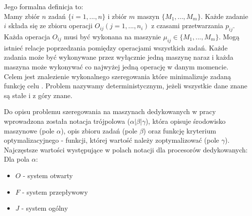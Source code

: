 \documentclass[brudnopis]{xmgr}
\begin{document}
Jego formalna definicja to:\\
Mamy zbiór $n$ zadań $\{i = 1,...,n\}$ i zbiór $m$ maszyn $\{M_1,...,M_m\}$. Każde zadanie $i$ składa się ze zbioru operacji $O_{ij} (j=1,...,n_i)$ z czasami przetwarzania $p_{ij}$. Każda operacja $O_{ij}$ musi być wykonana na maszynie $\mu_{ij} \in \{M_1,...,M_m\}$. Mogą istnieć relacje poprzedzania pomiędzy operacjami wszystkich zadań. Każde zadania może być wykonywane przez wyłącznie jedną maszynę naraz i każda maszyna może wykonywać co najwyżej jedną operację w danym momencie. Celem jest znalezienie wykonalnego szeregowania które minimalizuje zadaną funkcję celu \cite{brucker1999scheduling}. Problem nazywamy deterministycznym, jeżeli wszystkie dane znane są stałe i z góry znane.


Do opisu problemu szeregowania na maszynach dedykowanych w pracy \cite{graham1979optimization} wprowadzona została notacja trójpolowa ($\alpha|\beta|\gamma$), która opisuje środowisko maszynowe (pole $\alpha$), opis zbioru zadań (pole $\beta$) oraz funkcję kryterium optymalizacyjnego - funkcji, której wartość należy zoptymalizować (pole $\gamma$).\\

Najczęstsze wartości występujące w polach notacji dla procesorów dedykowanych:\\

Dla pola $\alpha$:
\begin{itemize}
    \item $O$ - system otwarty
    \item $F$ - system przepływowy
    \item $J$ - system ogólny
\end{itemize}
\end{document}

